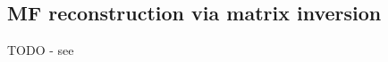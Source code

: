 \subsection{MF reconstruction via matrix inversion}

TODO - see \cite{gregory2021MolecularFramePhotoelectron}